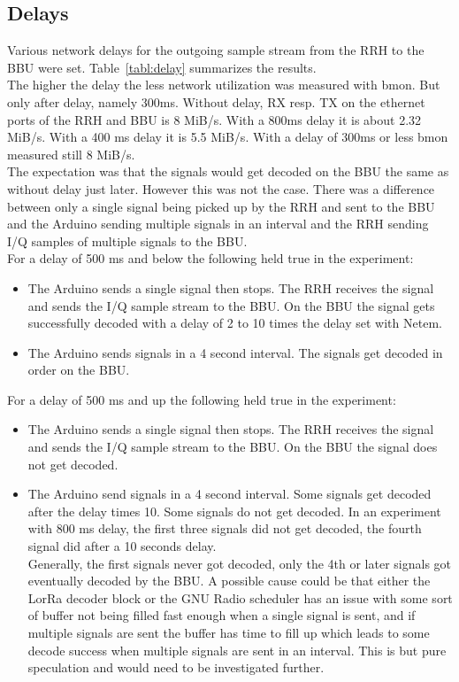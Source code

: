 \subsection{Delays}
Various network delays for the outgoing sample stream from the RRH to the BBU were set.
Table~\ref{tabl:delay} summarizes the results.
\\
The higher the delay the less network utilization was measured with bmon. But only after delay,
namely 300ms. Without delay, RX resp. TX on the ethernet ports of the RRH and BBU is 8 MiB/s.
With a 800ms delay it is about 2.32 MiB/s. With a 400 ms delay it is 5.5 MiB/s. With a delay 
of 300ms or less bmon measured still 8 MiB/s.
\\
The expectation was that the signals would get decoded on the BBU the same as without delay just later.
However this was not the case. There was a difference between only a single signal being picked up by the RRH and sent 
to the BBU and the Arduino sending multiple signals in an interval and the RRH sending I/Q samples of multiple signals 
to the BBU.
\\
For a delay of 500 ms and below the following held true in the experiment:
\\
\begin{itemize}
    \item The Arduino sends a single signal then stops. The RRH receives the signal and sends the I/Q sample stream
    to the BBU. On the BBU the signal gets successfully decoded with a delay of 2 to 10 times the delay set with Netem.
    \item The Arduino sends signals in a 4 second interval. The signals get decoded in order on the BBU.
\end{itemize}


For a delay of 500 ms and up the following held true in the experiment:
\\
\begin{itemize}
    \item The Arduino sends a single signal then stops. The RRH receives the signal and sends the I/Q sample stream 
    to the BBU. On the BBU the signal does not get decoded.
    \item The Arduino send signals in a 4 second interval. Some signals get decoded after the delay times 10. Some signals do not get decoded.
    In an experiment with 800 ms delay, the first three signals did not get decoded, the fourth signal did after a 10 seconds delay. \\
    Generally, the first signals never got decoded, only the 4th or later signals got eventually decoded by the BBU.
    A possible cause could be that either the LorRa decoder block or the GNU Radio scheduler has an issue 
    with some sort of buffer not being filled fast enough when a single signal is sent, and if multiple signals are sent 
    the buffer has time to fill up which leads to some decode success when multiple signals are sent in an interval.
    This is but pure speculation and would need to be investigated further.

\end{itemize}


